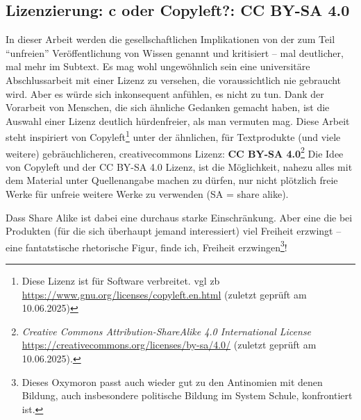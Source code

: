 \subsection{Lizenzierung: \acrfull{c} oder Copyleft?: CC BY-SA 4.0 \label{lizenz}}
In dieser Arbeit werden die gesellschaftlichen Implikationen von der zum Teil \enquote{unfreien}  Veröffentlichung von Wissen genannt und kritisiert -- mal deutlicher, mal mehr im Subtext.
Es mag wohl ungewöhnlich sein eine universitäre Abschlussarbeit mit einer Lizenz zu versehen, die voraussichtlich nie gebraucht wird. Aber es würde sich inkonsequent anfühlen, es nicht zu tun.
Dank der Vorarbeit von Menschen, die sich ähnliche Gedanken gemacht haben, ist die Auswahl einer Lizenz deutlich hürdenfreier, als man vermuten mag. Diese Arbeit steht inspiriert von Copyleft\footnote{Diese Lizenz ist für Software verbreitet. \gls{vgl} \gls{zb} \url{https://www.gnu.org/licenses/copyleft.en.html} (zuletzt geprüft am 10.06.2025)} unter der ähnlichen, für Textprodukte (und viele weitere) gebräuchlicheren, creativecommons Lizenz: \textbf{CC BY-SA 4.0}\footnote{\emph{Creative Commons Attribution-ShareAlike 4.0 International License} \url{https://creativecommons.org/licenses/by-sa/4.0/} (zuletzt geprüft am 10.06.2025).} Die Idee von Copyleft und der CC BY-SA 4.0 Lizenz, ist die Möglichkeit, nahezu alles mit dem Material unter Quellenangabe machen zu dürfen, nur nicht plötzlich freie Werke für unfreie weitere Werke zu verwenden (SA = share alike). 

Dass Share Alike ist dabei eine durchaus starke Einschränkung. Aber eine die bei Produkten (für die sich überhaupt jemand interessiert) viel Freiheit erzwingt -- eine fantatstische rhetorische Figur, finde ich, Freiheit erzwingen\footnote{Dieses Oxymoron passt auch wieder gut zu den Antinomien mit denen Bildung, auch insbesondere politische Bildung im System Schule, konfrontiert ist.}!

